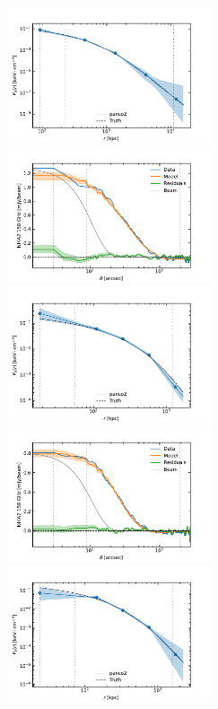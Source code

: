 \begin{figure}[t]
    \includegraphics[height=4cm, trim={0 0 1cm 0.5cm}, clip]{../validation/results/C2/SPT/pressure_profile.pdf} \\
    \includegraphics[height=4cm, trim={0 0 1cm 0.5cm}, clip]{../validation/results/C2/NIKA2/data_model_residuals_profiles.pdf}
    \includegraphics[height=4cm, trim={0 0 1cm 0.5cm}, clip]{../validation/results/C2/NIKA2/pressure_profile.pdf} \\
    \includegraphics[height=4cm, trim={0 0 1cm 0.5cm}, clip]{../validation/results/C3/NIKA2/data_model_residuals_profiles.pdf}
    \includegraphics[height=4cm, trim={0 0 1cm 0.5cm}, clip]{../validation/results/C3/NIKA2/pressure_profile.pdf}

\end{figure}
